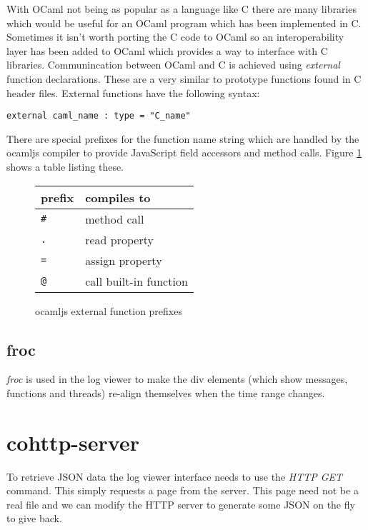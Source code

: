 With OCaml not being as popular as a language like C there are many libraries which would be useful for an OCaml program which has been implemented in C. Sometimes it isn't worth porting the C code to OCaml so an interoperability layer has been added to OCaml which provides a way to interface with C libraries. Communincation between OCaml and C is achieved using \emph{external} function declarations. These are a very similar to prototype functions found in C header files. External functions have the following syntax:

\begin{center}
\texttt{external caml\_name : type = "C\_name"}
\end{center}

There are special prefixes for the function name string which are handled by the ocamljs compiler to provide JavaScript field accessors and method calls. Figure \ref{external} shows a table listing these.

\begin{figure}
  \centering
  \begin{tabular}{|l|l|}
    \hline
    \textbf{prefix} & \textbf{compiles to}\\ \hline
    \texttt{\#} & method call\\ \hline
    \texttt{.} & read property\\ \hline
    \texttt{=} & assign property\\ \hline
    \texttt{@} & call built-in function\\ \hline
  \end{tabular}
  \caption{ocamljs external function prefixes}
  \label{external}
\end{figure}

\subsection{froc}
\emph{froc} is used in the log viewer to make the div elements (which show messages, functions and threads) re-align themselves when the time range changes.

\section{cohttp-server}
To retrieve JSON data the log viewer interface needs to use the \emph{HTTP GET} command. This simply requests a page from the server. This page need not be a real file and we can modify the HTTP server to generate some JSON on the fly to give back.

